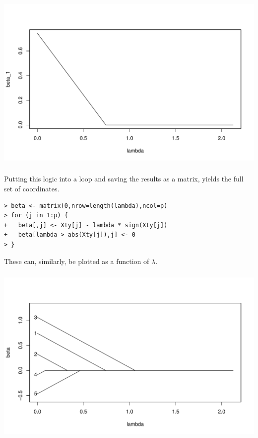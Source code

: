 \begin{frame}[fragile] \frametitle{}

\begin{center}
\includegraphics[width=\textwidth]{img/fig03.pdf}
\end{center}

\end{frame}

\begin{frame}[fragile] \frametitle{}

Putting this logic into a loop and saving the results
as a matrix, yields the full set of coordinates.
\begin{verbatim}
> beta <- matrix(0,nrow=length(lambda),ncol=p)
> for (j in 1:p) {
+   beta[,j] <- Xty[j] - lambda * sign(Xty[j])
+   beta[lambda > abs(Xty[j]),j] <- 0
> }
\end{verbatim}
These can, similarly, be plotted as a function of $\lambda$.

\end{frame}


\begin{frame}[fragile] \frametitle{}

\begin{center}
\includegraphics[width=\textwidth]{img/fig04.pdf}
\end{center}

\end{frame}

